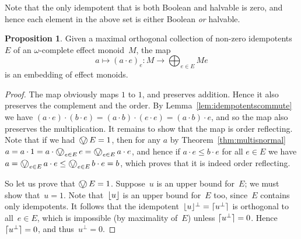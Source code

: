 \documentclass[10pt,conference]{IEEEtran}
\DeclarePairedDelimiter{\ceil}{\lceil}{\rceil}
\DeclarePairedDelimiter{\floor}{\lfloor}{\rfloor}
\newcounter{counter}
\theoremstyle{definition}
\newtheorem{proposition}[counter]{Proposition}
\newtheorem{lemma}[counter]{Lemma}
\newcommand{\bigovee}{\mathop{\vphantom{\sum}\mathchoice%
        {\vcenter{\hbox{\huge $\ovee$}}}%
        {\vcenter{\hbox{\Large $\ovee$}}}%
        {\ovee}{\ovee}}\displaylimits}
\begin{document}
Note that the only idempotent that is both Boolean and halvable is zero, and hence
each element in the above set is either Boolean \emph{or} halvable.


    


\begin{proposition}
Given a maximal orthogonal collection of non-zero idempotents~$E$
of an $\omega$-complete effect monoid~$M$,
the map
$$
    a\mapsto (a\cdot e)_e\colon M\longrightarrow \bigoplus_{e\in E} Me
$$
is an embedding of effect monoids.
\end{proposition}
\begin{proof}
    The map obviously maps $1$ to $1$, and preserves addition. 
    Hence it also preserves the complement and the order.
    By Lemma~\ref{lem:idempotentscommute} we have 
    $(a\cdot e)\cdot (b\cdot e) = (a\cdot b)\cdot (e\cdot e) =(a\cdot b)\cdot e$,
    and so the map also preserves the multiplication.
    It remains to show that the map is order reflecting. 
    Note that if we had~$\bigovee E = 1$,
    then for any $a$ by Theorem~\ref{thm:multisnormal} $a = a\cdot 1 = a\cdot \bigovee_{e\in E} e 
    = \bigovee_{e\in E} a\cdot e$, and hence
    if $a\cdot e \leq b\cdot e$ for all $e\in E$ we have
    $a = \bigovee_{e\in E} a\cdot e \leq \bigovee_{e\in E} b\cdot e = b$, which proves that it is indeed order reflecting.

    So let us prove that $\bigovee E = 1$. Suppose~$u$ is an upper bound for~$E$;
    we must show that~$u=1$.
    Note that~$\floor{u}$ is an upper bound for~$E$ too,
    since~$E$ contains only idempotents.
    It follows that the idempotent~$\floor{u}^\perp = \ceil{u^\perp}$ 
    is orthogonal
    to all~$e\in E$,
    which is impossible (by maximality of~$E$) unless
    $\ceil{u^\perp}= 0$.
    Hence~$\ceil{u^\perp}=0$,
    and thus~$u^\perp = 0$. 
\end{proof}
\end{document}
